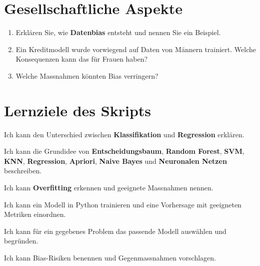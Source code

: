 \section{Gesellschaftliche Aspekte}

\begin{myexercise}
\begin{enumerate}
    \item Erklären Sie, wie \textbf{Datenbias} entsteht und nennen Sie ein Beispiel.
    \item Ein Kreditmodell wurde vorwiegend auf Daten von Männern trainiert.
          Welche Konsequenzen kann das für Frauen haben?
    \item Welche Massnahmen könnten Bias verringern?
\end{enumerate}
\end{myexercise}

\section{Lernziele des Skripts}

\begin{todolist}
    \item Ich kann den Unterschied zwischen \textbf{Klassifikation} und \textbf{Regression} erklären.
    \item Ich kann die Grundidee von \textbf{Entscheidungsbaum}, \textbf{Random Forest},
            \textbf{SVM}, \textbf{KNN}, \textbf{Regression}, \textbf{Apriori},
            \textbf{Naive Bayes} und \textbf{Neuronalen Netzen} beschreiben.
    \item Ich kann \textbf{Overfitting} erkennen und geeignete Massnahmen nennen.
    \item Ich kann ein Modell in Python trainieren und eine Vorhersage mit geeigneten
          Metriken einordnen.
    \item Ich kann für ein gegebenes Problem das passende Modell auswählen und begründen.
    \item Ich kann Bias-Risiken benennen und Gegenmassnahmen vorschlagen.
\end{todolist}
